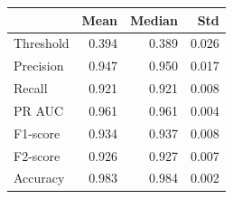 \begin{tabular}{lrrr}
\toprule
 & Mean & Median & Std \\
\midrule
Threshold & 0.394 & 0.389 & 0.026 \\
Precision & 0.947 & 0.950 & 0.017 \\
Recall & 0.921 & 0.921 & 0.008 \\
PR AUC & 0.961 & 0.961 & 0.004 \\
F1-score & 0.934 & 0.937 & 0.008 \\
F2-score & 0.926 & 0.927 & 0.007 \\
Accuracy & 0.983 & 0.984 & 0.002 \\
\bottomrule
\end{tabular}
